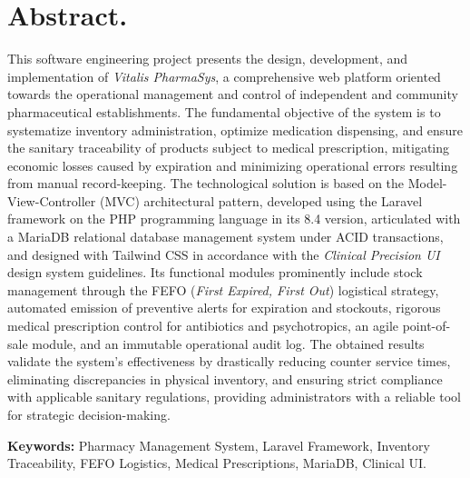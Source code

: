 \section*{Abstract.}

This software engineering project presents the design, development, and implementation of \textit{Vitalis PharmaSys}, a comprehensive web platform oriented towards the operational management and control of independent and community pharmaceutical establishments. The fundamental objective of the system is to systematize inventory administration, optimize medication dispensing, and ensure the sanitary traceability of products subject to medical prescription, mitigating economic losses caused by expiration and minimizing operational errors resulting from manual record-keeping. The technological solution is based on the Model-View-Controller (MVC) architectural pattern, developed using the Laravel framework on the PHP programming language in its 8.4 version, articulated with a MariaDB relational database management system under ACID transactions, and designed with Tailwind CSS in accordance with the \textit{Clinical Precision UI} design system guidelines. Its functional modules prominently include stock management through the FEFO (\textit{First Expired, First Out}) logistical strategy, automated emission of preventive alerts for expiration and stockouts, rigorous medical prescription control for antibiotics and psychotropics, an agile point-of-sale module, and an immutable operational audit log. The obtained results validate the system's effectiveness by drastically reducing counter service times, eliminating discrepancies in physical inventory, and ensuring strict compliance with applicable sanitary regulations, providing administrators with a reliable tool for strategic decision-making.

\vspace{0.5cm}
\noindent \textbf{Keywords:} Pharmacy Management System, Laravel Framework, Inventory Traceability, FEFO Logistics, Medical Prescriptions, MariaDB, Clinical UI.
